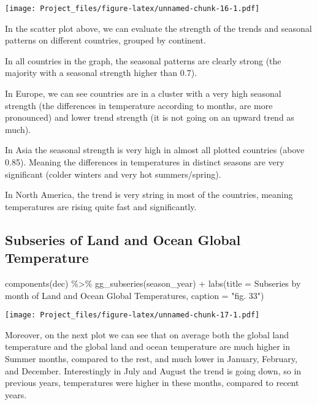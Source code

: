 \documentclass[
]{article}
\newenvironment{Shaded}{\begin{snugshade}}{\end{snugshade}}
\newcommand{\AttributeTok}[1]{\textcolor[rgb]{0.77,0.63,0.00}{#1}}
\newcommand{\FunctionTok}[1]{\textcolor[rgb]{0.00,0.00,0.00}{#1}}
\newcommand{\NormalTok}[1]{#1}
\newcommand{\SpecialCharTok}[1]{\textcolor[rgb]{0.00,0.00,0.00}{#1}}
\newcommand{\StringTok}[1]{\textcolor[rgb]{0.31,0.60,0.02}{#1}}
\begin{document}
\texttt{[image: Project\_files/figure-latex/unnamed-chunk-16-1.pdf]}

In the scatter plot above, we can evaluate the strength of the trends
and seasonal patterns on different countries, grouped by continent.

In all countries in the graph, the seasonal patterns are clearly strong
(the majority with a seasonal strength higher than 0.7).

In Europe, we can see countries are in a cluster with a very high
seasonal strength (the differences in temperature according to months,
are more pronounced) and lower trend strength (it is not going on an
upward trend as much).

In Asia the seasonal strength is very high in almost all plotted
countries (above 0.85). Meaning the differences in temperatures in
distinct seasons are very significant (colder winters and very hot
summers/spring).

In North America, the trend is very string in most of the countries,
meaning temperatures are rising quite fast and significantly.

\hypertarget{subseries-of-land-and-ocean-global-temperature}{%
\subsection{Subseries of Land and Ocean Global
Temperature}\label{subseries-of-land-and-ocean-global-temperature}}

\begin{Shaded}
\begin{Highlighting}[]
\FunctionTok{components}\NormalTok{(dec) }\SpecialCharTok{\%\textgreater{}\%} \FunctionTok{gg\_subseries}\NormalTok{(season\_year) }\SpecialCharTok{+} 
  \FunctionTok{labs}\NormalTok{(}\AttributeTok{title =} \StringTok{\textquotesingle{}Subseries by month of Land and Ocean Global Temperatures\textquotesingle{}}\NormalTok{, }\AttributeTok{caption =} \StringTok{"fig. 33"}\NormalTok{) }
\end{Highlighting}
\end{Shaded}

\texttt{[image: Project\_files/figure-latex/unnamed-chunk-17-1.pdf]}

Moreover, on the next plot we can see that on average both the global
land temperature and the global land and ocean temperature are much
higher in Summer months, compared to the rest, and much lower in
January, February, and December. Interestingly in July and August the
trend is going down, so in previous years, temperatures were higher in
these months, compared to recent years.
\end{document}
